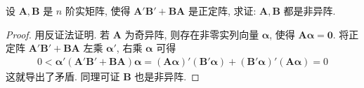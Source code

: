 \documentclass[../../main.tex]{subfiles}%
\begin{document}
\begin{proposition}\label{proposition:两个正定阵和非异阵的关系}
设 \(\boldsymbol{A},\boldsymbol{B}\) 是 \(n\) 阶实矩阵, 使得 \(\boldsymbol{A}'\boldsymbol{B}'+\boldsymbol{B}\boldsymbol{A}\) 是正定阵, 求证: \(\boldsymbol{A},\boldsymbol{B}\) 都是非异阵.
\end{proposition}
\begin{proof}
用反证法证明. 若 \(\boldsymbol{A}\) 为奇异阵, 则存在非零实列向量 \(\boldsymbol{\alpha}\), 使得 \(\boldsymbol{A}\boldsymbol{\alpha}=\boldsymbol{0}\). 将正定阵 \(\boldsymbol{A}'\boldsymbol{B}'+\boldsymbol{B}\boldsymbol{A}\) 左乘 \(\boldsymbol{\alpha}'\), 右乘 \(\boldsymbol{\alpha}\) 可得
\begin{align*}
0<\boldsymbol{\alpha}'(\boldsymbol{A}'\boldsymbol{B}'+\boldsymbol{B}\boldsymbol{A})\boldsymbol{\alpha}=(\boldsymbol{A}\boldsymbol{\alpha})'(\boldsymbol{B}'\boldsymbol{\alpha})+(\boldsymbol{B}'\boldsymbol{\alpha})'(\boldsymbol{A}\boldsymbol{\alpha})= 0
\end{align*}
这就导出了矛盾. 同理可证 \(\boldsymbol{B}\) 也是非异阵. 
\end{proof}
\end{document}
